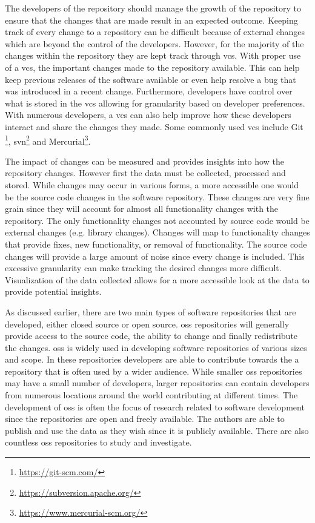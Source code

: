 The developers of the repository should manage the growth of the repository to ensure that the changes that are made result in an expected outcome. Keeping track of every change to a repository can be difficult because of external changes which are beyond the control of the developers. However, for the majority of the changes within the repository they are kept track through \gls{vcs}. With proper use of a \gls{vcs}, the important changes made to the repository available. This can help keep previous releases of the software available or even help resolve a bug that was introduced in a recent change. Furthermore, developers have control over what is stored in the \gls{vcs} allowing for granularity based on developer preferences. With numerous developers, a \gls{vcs} can also help improve how these developers interact and share the changes they made. Some commonly used \gls{vcs} include Git \footnote{\url{https://git-scm.com/}}, \gls{svn}\footnote{\url{https://subversion.apache.org/}} and Mercurial\footnote{\url{https://www.mercurial-scm.org/}}.

The impact of changes can be measured and provides insights into how the repository changes. However first the data must be collected, processed and stored. While changes may occur in various forms, a more accessible one would be the source code changes in the software repository. These changes are very fine grain since they will account for almost all functionality changes with the repository. The only functionality changes not accounted by source code would be external changes (e.g. library changes). Changes will map to functionality changes that provide fixes, new functionality, or removal of functionality. The source code changes will provide a large amount of noise since every change is included. This excessive granularity can make tracking the desired changes more difficult. Visualization of the data collected allows for a more accessible look at the data to provide potential insights.



As discussed earlier, there are two main types of software repositories that are developed, either closed source or open source. \gls{oss} repositories will generally provide access to the source code, the ability to change and finally redistribute the changes. \gls{oss} is widely used in developing software repositories of various sizes and scope. In these repositories developers are able to contribute towards the a repository that is often used by a wider audience. While smaller \gls{oss} repositories may have a small number of developers, larger repositories can contain developers from numerous locations around the world contributing at different times. The development of \gls{oss} is often the focus of research related to software development since the repositories are open and freely available. The authors are able to publish and use the data as they wish since it is publicly available. There are also countless \gls{oss} repositories to study and investigate.

